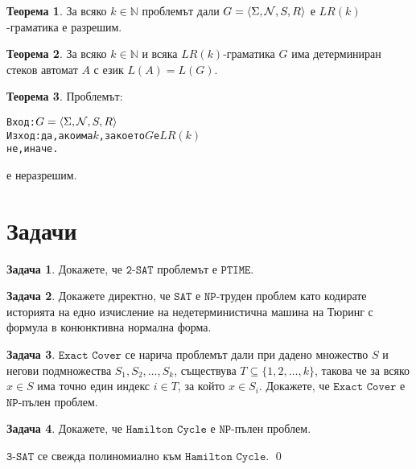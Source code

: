 \documentclass[a4paper]{article}
\theoremstyle{definition}
\newtheorem{theorem}{Теорема}
\newtheorem{problem}{Задача}
\newenvironment{hint}{\noindent{\bf Упътване.}\hspace*{1em}}{\qed\par\vspace*{1em}}
\begin{document}
\begin{theorem}
За всяко $k\in \mathbb{N}$ проблемът дали $G=\langle \Sigma,{\cal N},S,R\rangle$ е $LR(k)$-граматика е разрешим. 
\end{theorem}

\begin{theorem}
За всяко $k\in \mathbb{N}$ и всяка $LR(k)$-граматика $G$ има детерминиран стеков автомат $A$ с език $L(A)=L(G)$.
\end{theorem}

\begin{theorem}
Проблемът:
\begin{alltt}
Вход: \(G=\langle \Sigma,{\cal{N}},S,R\rangle\)
Изход: да, ако има \(k\), за което \(G\) е \(LR(k)\)
	       не, иначе.
\end{alltt}
е неразрешим.
\end{theorem}


\section{Задачи}


\begin{problem}
  Докажете, че $\texttt{2-SAT}$ проблемът е $\texttt{PTIME}$.
\end{problem}

\begin{problem}
  Докажете директно, че $\texttt{SAT}$ е $\texttt{NP}$-труден проблем
  като кодирате историята на едно изчисление на недетерминистична машина на Тюринг
  с формула в конюнктивна нормална форма.
\end{problem}

\begin{problem}
  $\texttt{Exact Cover}$ се нарича проблемът дали при дадено множество $S$ и негови подмножества $S_1,S_2,\dots,S_k$,
  съществува $T \subseteq \{1,2,\dots,k\}$, такова че 
  за всяко $x \in S$ има точно един индекс $i \in T$, за който $x \in S_i$.  
  Докажете, че $\texttt{Exact Cover}$ е $\texttt{NP}$-пълен проблем.
\end{problem}

\begin{problem}
  Докажете, че $\texttt{Hamilton Cycle}$ е $\texttt{NP}$-пълен проблем.
\end{problem}
\begin{hint}
  $\texttt{3-SAT}$ се свежда полиномиално към $\texttt{Hamilton Cycle}$.
\end{hint}
\end{document}
